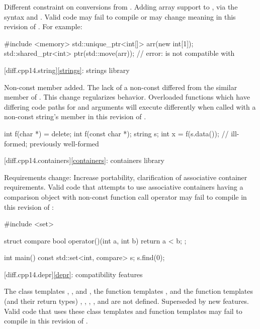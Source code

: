 \change
Different constraint on conversions from .
\rationale
Adding array support to ,
via the syntax  and .
\effect
Valid \CppXIV{} code may fail to compile or may change meaning in this
revision of \Cpp{}.
For example:
\begin{codeblock}
#include <memory>
std::unique_ptr<int[]> arr(new int[1]);
std::shared_ptr<int> ptr(std::move(arr));   // error:  is not compatible with 
\end{codeblock}

[diff.cpp14.string]{\ref{strings}: strings library}

\change
Non-const  member added.
\rationale
The lack of a non-const 
differed from the similar member of .
This change regularizes behavior.
\effect
Overloaded functions which have differing code paths
for  and  arguments
will execute differently
when called with a non-const string's  member
in this revision of \Cpp{}.

\begin{codeblock}
int f(char *) = delete;
int f(const char *);
string s;
int x = f(s.data());            // ill-formed; previously well-formed
\end{codeblock}

[diff.cpp14.containers]{\ref{containers}: containers library}

\change
Requirements change:
\rationale
Increase portability, clarification of associative container requirements.
\effect
Valid \CppXIV{} code that attempts to use associative containers
having a comparison object with non-const function call operator
may fail to compile in this revision of \Cpp{}:
\begin{codeblock}
#include <set>

struct compare
{
  bool operator()(int a, int b)
  {
    return a < b;
  }
};

int main() {
  const std::set<int, compare> s;
  s.find(0);
}
\end{codeblock}

[diff.cpp14.depr]{\ref{depr}: compatibility features}

\nodiffref
\change
The class templates
,
, and
,
the function templates
,
and the function templates (and their return types)
,
,
,
, and
are not defined.
\rationale
Superseded by new features.
\effect
Valid \CppXIV{} code that uses these class templates
and function templates may fail to compile in this revision of \Cpp{}.

